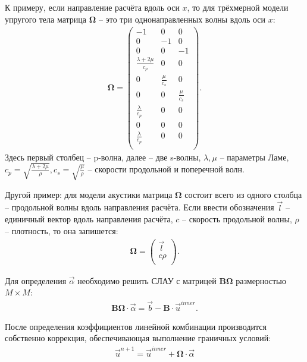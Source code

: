 \documentclass[a4paper]{article}
\numberwithin{equation}{section}
\begin{document}
К примеру, если направление расчёта вдоль оси $x$, то 
для трёхмерной модели упругого тела матрица $\mathbf{\Omega}$ -- 
это три однонаправленных волны вдоль оси $x$:
\begin{align}
\label{Omega_for_elastic3D}
	\mathbf{\Omega} =
	\left( \begin{array}{cccccccccccc}
	-1 & 0  &  0 \\
	 0 & -1 &  0 \\
	 0 &  0 & -1 \\
	\frac{\lambda+2\mu}{c_p} & 0 & 0 \\
	0 & \frac{\mu}{c_s} & 0 \\
	0 & 0 & \frac{\mu}{c_s} \\
	\frac{\lambda}{c_p} & 0 & 0 \\
	0 & 0 & 0 \\
	\frac{\lambda}{c_p} & 0 & 0 \\
	\end{array} \right).
\end{align} 
Здесь первый столбец -- p-волна, далее -- две s-волны, 
$\lambda, \mu$ -- параметры Ламе, 
$c_p = \sqrt{\frac{\lambda + 2\mu}{\rho}}, c_s = \sqrt{\frac{\mu}{\rho}}$ -- 
скорости продольной и поперечной волн.

Другой пример: для модели акустики матрица $\mathbf{\Omega}$ состоит 
всего из одного столбца -- продольной волны вдоль направления расчёта. 
Если ввести обозначения $\vec{l}$ -- единичный вектор вдоль направления расчёта,
$c$ -- скорость продольной волны, $\rho$ -- плотность, то она запишется:
\begin{align}
\label{Omega_for_acoustic}
	\mathbf{\Omega} =
	\left( \begin{array}{cccccccccccc}
	 \vec{l} \\
	 c \rho \\
	\end{array} \right).
\end{align} 

Для определения $\vec{\alpha}$ необходимо решить 
СЛАУ с матрицей $\mathbf{B} \mathbf{\Omega}$ размерностью $M \times M$:
\begin{eqnarray}
\label{SLE_on_alpha}
	\mathbf{B} \mathbf{\Omega} \cdot \vec{\alpha} = \vec{b} - \mathbf{B} \cdot \vec{u}^{inner}.
\end{eqnarray}

После определения коэффициентов линейной комбинации производится собственно коррекция,
обеспечивающая выполнение граничных условий:
\begin{eqnarray}
\vec{u}^{n+1} = \vec{u}^{inner} + \mathbf{\Omega} \cdot \vec{\alpha}
\end{eqnarray}
\end{document}
